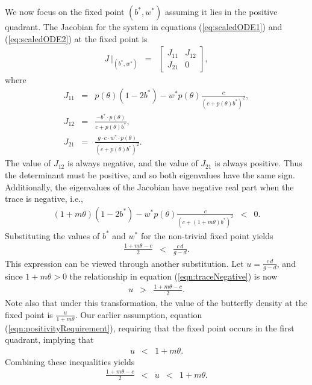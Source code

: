 \documentclass[review,authoryear]{elsarticle}
\begin{document}
We now focus on the fixed point $(b^*,w^*)$ assuming it lies in the positive quadrant.
The Jacobian for the system in equations (\ref{eq:scaledODE1}) and
(\ref{eq:scaledODE2}) at the fixed point is
\begin{eqnarray}
  J ~ \bigg|_{(b^*,w^*)} & = &
          \left[
          \begin{array}{rr}
            J_{11} & J_{12} \\
            J_{21} & 0
          \end{array}
          \right],
\end{eqnarray}
where
\begin{eqnarray}
  \label{eq:jacobian}
  J_{11} & = & p(\theta)(1-2b^*) - w^* p(\theta)\frac{c}{(c+p(\theta)b^*)^2}, \\
  J_{12} & = & \frac{-b^*\cdot p(\theta)}{c+p(\theta)b^*}, \\
  J_{21} & = & \frac{g\cdot c \cdot w^* \cdot p(\theta)}{(c+p(\theta)b^*)^2}.
\end{eqnarray}
The value of $J_{12}$ is always negative, and the value of $J_{21}$ is always positive. Thus the determinant must be positive, and so both eigenvalues have the same sign.
Additionally, the eigenvalues of the Jacobian have negative real part when the
trace is negative, i.e.,
\begin{eqnarray}
  (1+m\theta)(1-2b^*) - w^* p(\theta)\frac{c}{(c+(1+m\theta)b^*)^2} & < & 0.
\end{eqnarray}
Substituting the values of $b^*$ and $w^*$ for the non-trivial fixed point
yields
\begin{eqnarray}
  \label{eqn:traceNegative}
  \frac{1+m\theta-c}{2} & < & \frac{c\,d}{g-d}.
\end{eqnarray}
This expression can be viewed through another substitution. Let
$u=\frac{c\,d}{g-d}$, and since
$1+m\theta>0$ the relationship in equation
(\ref{eqn:traceNegative}) is now
\begin{eqnarray}
  \label{eq:stabilityParameters}
  u & > & \frac{1+m\theta-c}{2}.
\end{eqnarray}
Note also that under this transformation, the value of the butterfly
density at the fixed point is $\frac{u}{1+m\theta}$. Our earlier assumption, equation (\ref{eqn:positivityRequirement}), requiring that the fixed point occurs in the first quadrant,  implying that
\begin{eqnarray}
  \label{eq:boundFixedPoint}
  u & < & 1+m\theta.
\end{eqnarray}
Combining these inequalities yields
\begin{equation}
  \begin{array}{rcccl}
  \frac{1+m\theta-c}{2}  & <  & u  & < & 1+m\theta.
  \end{array}
\end{equation}
\end{document}
